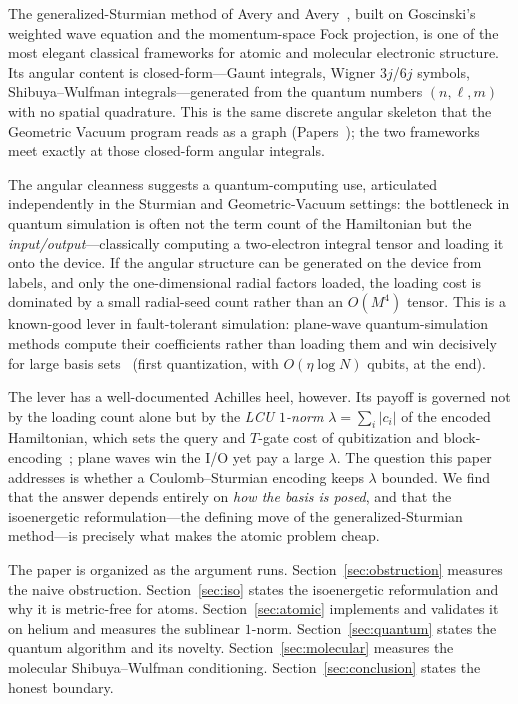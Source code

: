 \documentclass[aps,pra,twocolumn,superscriptaddress,longbibliography]{revtex4-2}
\begin{document}
The generalized-Sturmian method of Avery and
Avery~\cite{avery1989,avery2006,averyphd,averymsc}, built on Goscinski's~\cite{goscinski2002}
weighted wave equation and the momentum-space Fock projection, is one of the most
elegant classical frameworks for atomic and molecular electronic structure.  Its
angular content is closed-form---Gaunt integrals, Wigner $3j$/$6j$ symbols,
Shibuya--Wulfman integrals---generated from the quantum numbers $(n,\ell,m)$ with
no spatial quadrature.  This is the same discrete angular skeleton that the
Geometric Vacuum program reads as a graph
(Papers~\cite{loutey_paper58,loutey_paper59}); the two frameworks meet exactly at
those closed-form angular integrals.

The angular cleanness suggests a quantum-computing use, articulated
independently in the Sturmian and Geometric-Vacuum settings: the bottleneck in
quantum simulation is often not the term count of the Hamiltonian but the
\emph{input/output}---classically computing a two-electron integral tensor and
loading it onto the device.  If the angular structure can be generated on the
device from labels, and only the one-dimensional radial factors loaded, the
loading cost is dominated by a small radial-seed count rather than an
$O(M^4)$ tensor.  This is a known-good lever in fault-tolerant simulation:
plane-wave quantum-simulation methods compute their coefficients rather than
loading them and win decisively for large basis
sets~\cite{babbush2018,su2021} (first quantization, with $O(\eta\log N)$ qubits,
at the \cite{su2021} end).

The lever has a well-documented Achilles heel, however.  Its payoff is governed
not by the loading count alone but by the \emph{LCU $1$-norm}
$\lambda=\sum_i|c_i|$ of the encoded Hamiltonian, which sets the query and
$T$-gate cost of qubitization and
block-encoding~\cite{lowchuang2019,liang2022}; plane waves win the I/O yet pay a
large $\lambda$.  The question this paper addresses is whether a
Coulomb--Sturmian encoding keeps $\lambda$ bounded.  We find that the answer
depends entirely on \emph{how the basis is posed}, and that the isoenergetic
reformulation---the defining move of the generalized-Sturmian method---is
precisely what makes the atomic problem cheap.

The paper is organized as the argument runs.  Section~\ref{sec:obstruction}
measures the naive obstruction.  Section~\ref{sec:iso} states the isoenergetic
reformulation and why it is metric-free for atoms.  Section~\ref{sec:atomic}
implements and validates it on helium and measures the sublinear $1$-norm.
Section~\ref{sec:quantum} states the quantum algorithm and its novelty.
Section~\ref{sec:molecular} measures the molecular Shibuya--Wulfman conditioning.
Section~\ref{sec:conclusion} states the honest boundary.
\end{document}
